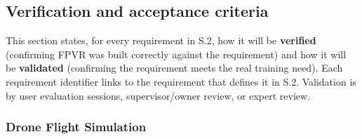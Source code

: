 \documentclass[12pt]{article}
\begin{document}
\clearpage

\subsection{Verification and acceptance criteria}\label{s6}

This section states, for every requirement in S.2, how it will be
\textbf{verified} (confirming FPVR was built correctly against the
requirement) and how it will be \textbf{validated} (confirming the
requirement meets the real training need). Each requirement identifier
links to the requirement that defines it in S.2. Validation is by user
evaluation sessions, supervisor/owner review, or expert review.

\begingroup
\sloppy

\subsubsection{Drone Flight Simulation}
\end{document}
